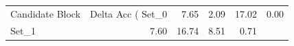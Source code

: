\begin{tabular}{lrrrr}
\toprule
Candidate Block & Delta Acc (%
\midrule
Set_0 & 7.65 & 2.09 & 17.02 & 0.00 \\
Set_1 & 7.60 & 16.74 & 8.51 & 0.71 \\
\bottomrule
\end{tabular}
